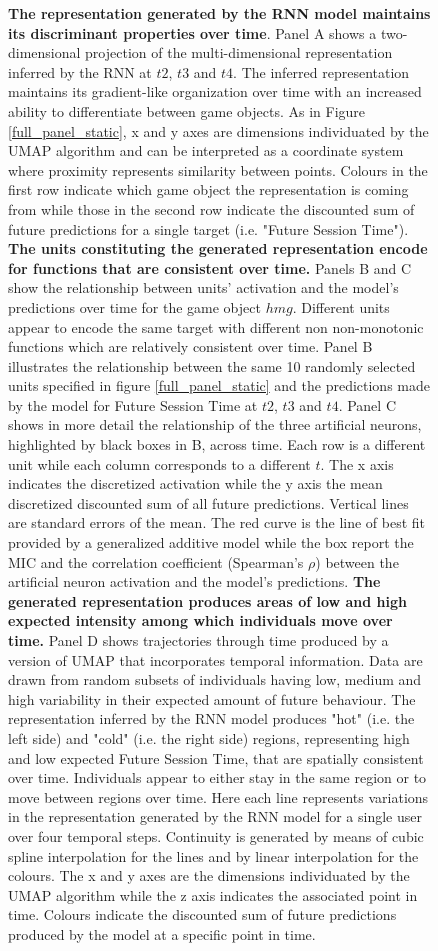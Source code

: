 \begin{figure}[ht]
\caption{\textbf{The representation generated by the RNN model maintains its discriminant properties over time}. Panel A shows a two-dimensional projection of the multi-dimensional representation inferred by the RNN at $t2$, $t3$ and $t4$. The inferred representation maintains its gradient-like organization over time with an increased ability to differentiate between game objects. As in Figure \ref{full_panel_static}, x and y axes are dimensions individuated by the UMAP algorithm and can be interpreted as a coordinate system where proximity represents similarity between points. Colours in the first row indicate which game object the representation is coming from while those in the second row indicate the discounted sum of future predictions for a single target (i.e. "Future Session Time"). \textbf{The units constituting the generated representation encode for functions that are consistent over time.} Panels B and C show the relationship between units' activation and the model's predictions over time for the game object $hmg$. Different units appear to encode the same target with different non non-monotonic functions which are relatively consistent over time. Panel B illustrates the relationship between the same 10 randomly selected units specified in figure \ref{full_panel_static} and the predictions made by the model for Future Session Time at $t2$, $t3$ and $t4$. Panel C shows in more detail the relationship of the three artificial neurons, highlighted by black boxes in B, across time. Each row is a different unit while each column corresponds to a different $t$. The x axis indicates the discretized activation while the y axis the mean discretized discounted sum of all future predictions. Vertical lines are standard errors of the mean. The red curve is the line of best fit provided by a generalized additive model \cite{serven2018} while the box report the MIC and the correlation coefficient (Spearman's $\rho$) between the artificial neuron activation and the model's predictions. \textbf{The generated representation produces areas of low and high expected intensity among which individuals move over time.} Panel D shows trajectories through time produced by a version of UMAP that incorporates temporal information. Data are drawn from random subsets of individuals having low, medium and high variability in their expected amount of future behaviour. The representation inferred by the RNN model produces "hot" (i.e. the left side) and "cold" (i.e. the right side) regions, representing high and low expected Future Session Time, that are spatially consistent over time. Individuals appear to either stay in the same region or to move between regions over time. Here each line represents variations in the representation generated by the RNN model for a single user over four temporal steps. Continuity is generated by means of cubic spline interpolation for the lines and by linear interpolation for the colours. The x and y axes are the dimensions individuated by the UMAP algorithm while the z axis indicates the associated point in time. Colours indicate the discounted sum of future predictions produced by the model at a specific point in time.}
\label{full_panel_temporal}
\end{figure}

